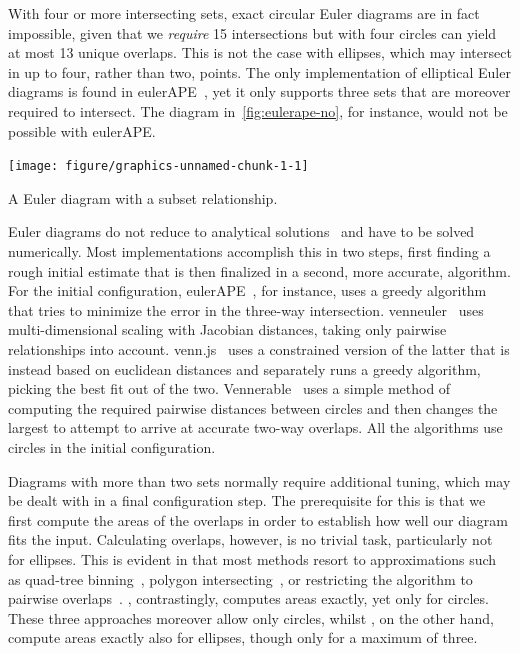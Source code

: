 \documentclass[
  oneside,
  openany,
  numbers=noendperiod,
  parskip=half,
  bibliography=totoc
]{scrbook}\usepackage[]{graphicx}\usepackage{xcolor}
\newenvironment{knitrout}{}{} %
\newcommand{\pkg}[1]{{\fontseries{b}\selectfont #1}}
\begin{document}
With four or more intersecting sets, exact circular Euler diagrams are in fact
impossible, given that we \emph{require} 15 intersections but with four circles
can yield at most 13 unique overlaps. This is not the case with ellipses, which
may intersect in up to four, rather than two, points. The only implementation of
elliptical Euler diagrams is found in \pkg{eulerAPE}~\citep{micallef_2014a}, yet
it only supports three sets that are moreover required to intersect. The
diagram in~\cref{fig:eulerape-no}, for instance, would not be possible
with \pkg{eulerAPE}.

\begin{marginfigure}
\begin{knitrout}\small
{}\color{fgcolor}

{\centering \texttt{[image: figure/graphics-unnamed-chunk-1-1]} 

}



\end{knitrout}
\caption{A Euler diagram with a subset relationship.}
\label{fig:eulerape-no}
\end{marginfigure}

Euler diagrams do not reduce to analytical solutions~\citep{chow_2007} and have
to be solved numerically. Most implementations accomplish this in two steps,
first finding a rough initial estimate that is then finalized in a second, more
accurate, algorithm. For the initial configuration,
\pkg{eulerAPE}~\citep{micallef_2013}, for instance, uses a greedy algorithm that
tries to minimize the error in the three-way intersection.
\pkg{venneuler}~\citep{wilkinson_2012} uses multi-dimensional scaling with
Jacobian distances, taking only pairwise relationships into account.
\pkg{venn.js}~\citep{frederickson_2016} uses a constrained version of the latter
that is instead based on euclidean distances and separately runs a greedy
algorithm, picking the best fit out of the two.
\pkg{Vennerable}~\citep{swinton_2011} uses a simple method of computing the
required pairwise distances between circles and then changes the largest to
attempt to arrive at accurate two-way overlaps. All the algorithms use
circles in the initial configuration.

Diagrams with more than two sets normally require additional tuning, which may
be dealt with in a final configuration step. The prerequisite for this is that
we first compute the areas of the overlaps in order to establish how well our
diagram fits the input. Calculating overlaps, however, is no trivial task,
particularly not for ellipses. This is evident in that most methods resort to
approximations such as quad-tree binning~\citep{wilkinson_2012}, polygon
intersecting~\citep{kestler_2008}, or restricting the algorithm to pairwise
overlaps~\citep{swinton_2011}. \citet{frederickson_2016}, contrastingly,
computes areas exactly, yet only for circles. These three approaches moreover allow only
circles, whilst \citet{micallef_2014a}, on the other hand, compute areas exactly
also for ellipses, though only for a maximum of three.
\end{document}

